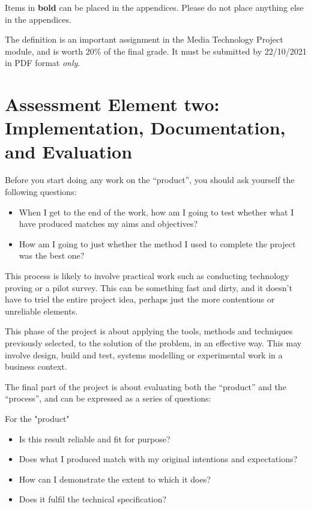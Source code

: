Items in \textbf{bold} can be placed in the appendices. Please do not place anything else in the appendices. 

\begin{tcolorbox}
    The definition is an important assignment in the Media Technology Project module, and is worth 20\% of the final grade. It must be submitted by 22/10/2021 in PDF format \textit{only}. 
\end{tcolorbox}

\section{Assessment Element two: Implementation, Documentation, and Evaluation}

Before you start doing any work on the “product”, you should ask yourself the following questions:

\begin{itemize}
    \item When I get to the end of the work, how am I going to test whether what I have produced matches my aims and objectives?
    \item How am I going to just whether the method I used to complete the project was the best one? 
\end{itemize}

This process is likely to involve practical work such as conducting technology proving or a pilot survey. This can be something fast and dirty, and it doesn't have to triel the entire project idea, perhaps just the more contentious or unreliable elements. 

This phase of the project is about applying the tools, methods and techniques previously selected, to the solution of the problem, in an effective way. This may involve design, build and test, systems modelling or experimental work in a business context.

The final part of the project is about evaluating both the “product” and the “process”, and can be expressed as a series of questions:

For the "product"

\begin{itemize}
    \item Is this result reliable and fit for purpose?
    \item Does what I produced match with my original intentions and expectations?
    \item How can I demonstrate the extent to which it does? 
    \item Does it fulfil the technical specification?
\end{itemize}

